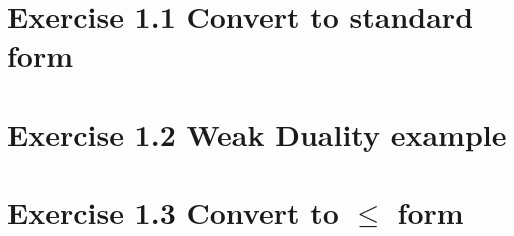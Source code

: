 \section{Exercise 1.1 Convert to standard form}

\section{Exercise 1.2 Weak Duality example}

\section{Exercise 1.3 Convert to $\leq$ form}
